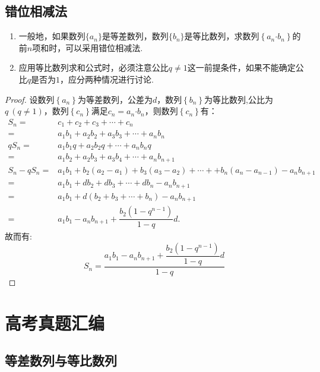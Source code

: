 \documentclass{BHCexam}
\begin{document}
\subsection{错位相减法}
\begin{enumerate}
\item 一般地，如果数列$\{a_n\}$是等差数列，数列$\{b_n\}$是等比数列，求数列$ \left\{a_n\bm{\cdot}b_n\right\} $的前$ n $项和时，可以采用错位相减法.
\item 应用等比数列求和公式时，必须注意公比$ q\ne1 $这一前提条件，如果不能确定公比$ q $是否为$ 1 $，应分两种情况进行讨论.
\end{enumerate}
\begin{proof}
设数列$ \left\{a_n\right\} $为等差数列，公差为$ d $，数列$ \left\{b_n\right\} $为等比数列,公比为$ q ~(q\ne1)$，数列$ \left\{c_n\right\}$满足$ c_n=a_n\bm{\cdot}b_n  $，则数列$ \left\{c_n\right\} $有：\begin{equation*}
\begin{aligned}
S_n=&c_1+c_2+c_3+\cdots+c_n\\
=&a_1b_1+a_2b_2+a_3b_3+\cdots+a_nb_n\\
qS_n=&a_1b_1q+a_2b_2q+\cdots+a_nb_nq\\
=&a_1b_2+a_2b_3+a_3b_4+\cdots+a_nb_{n+1}\\
S_n-qS_n=&a_1b_1+b_2\left(a_2-a_1\right)+b_3\left(a_3-a_2\right)+\cdots++b_n\left(a_n-a_{n-1}\right)-a_nb_{n+1}\\
=&a_1b_1+db_2+db_3+\cdots+db_n-a_nb_{n+1}\\
=&a_1b_1+d\left(b_2+b_3+\cdots+b_n\right)-a_nb_{n+1}\\
=&a_1b_1-a_nb_{n+1}+\dfrac{b_2\left(1-q^{n-1}\right)}{1-q}d.
\end{aligned}
\end{equation*}
故而有:$$S_n=\dfrac{a_1b_1-a_nb_{n+1}+\dfrac{b_2\left(1-q^{n-1}\right)}{1-q}d}{1-q}$$
\end{proof}
\newpage 
\section{高考真题汇编}
\subsection{等差数列与等比数列}
\end{document}
